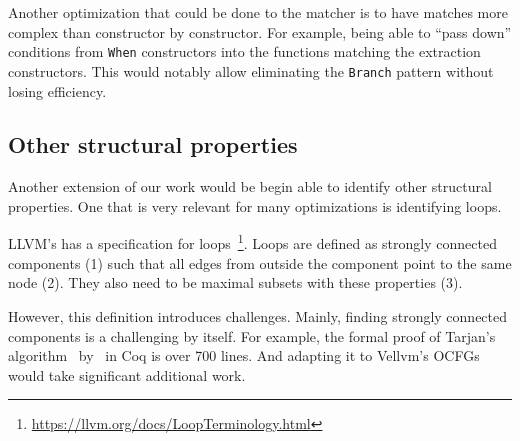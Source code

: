 \documentclass[11pt]{article}
\newcommand{\inlinecoq}[1]{\mbox{\lstinline[style=customcoq,columns=fixed,basewidth=.48em]{#1}}}
\newcommand{\ilc}[1]{\inlinecoq{#1}}
\newcommand{\ocfg}{OCFG\xspace}
\begin{document}
Another optimization that could be done to the matcher is to have matches more complex than constructor by constructor. For example, being able to ``pass down'' conditions from \ilc{When} constructors into the functions matching the extraction constructors. This would notably allow eliminating the \ilc{Branch} pattern without losing efficiency.

\subsection{Other structural properties}

Another extension of our work would be begin able to identify other structural properties. One that is very relevant for many optimizations is identifying loops.

LLVM's has a specification for loops~\footnote{\url{https://llvm.org/docs/LoopTerminology.html}}. Loops are defined as strongly connected components (1) such that all edges from outside the component point to the same node (2). They also need to be maximal subsets with these properties (3).

However, this definition introduces challenges. Mainly, finding strongly connected components is a challenging by itself. For example, the formal proof of Tarjan's algorithm~\cite{Tarjan} by~\citet{FormalTrajan} in Coq is over 700 lines. And adapting it to Vellvm's \ocfg{}s would take significant additional work.





\end{document}
